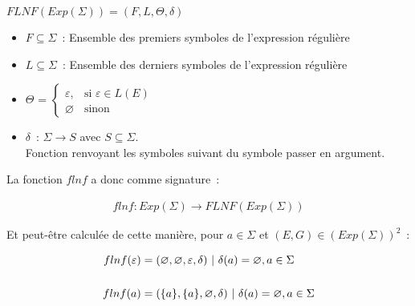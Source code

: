 \vphantom{}

\begin{center}
    \(FLNF(Exp(\Sigma)) = (F, L, \Theta, \delta)\)

    \begin{itemize}
        \item[\textbullet] \(F \subseteq \Sigma\)~: Ensemble des premiers
            symboles de l'expression régulière

            \vphantom{}

        \item[\textbullet] \(L \subseteq \Sigma\)~: Ensemble des derniers
            symboles de l'expression régulière

            \vphantom{}

        \item[\textbullet] \(\Theta\) =
            \(
            \begin{cases}
                \varepsilon, & \text{si } \varepsilon \in L(E) \\
                \varnothing  & \text{sinon}
            \end{cases}
            \)

            \vphantom{}

        \item[\textbullet] \(\delta\)~: \(\Sigma \to S\) avec \(S \subseteq
            \Sigma\). \\
            Fonction renvoyant les symboles suivant du symbole passer en argument.
    \end{itemize}
\end{center}

La fonction \(flnf\) a donc comme signature~:

\begin{align*}
    flnf: Exp(\Sigma) \to FLNF(Exp(\Sigma))
\end{align*}

Et peut-être calculée de cette manière, pour \(a \in \Sigma\) et \((E, G) \in
(Exp(\Sigma))^2\)~:

\begin{align*}
    flnf(\varepsilon) & = (\varnothing, \varnothing, \varepsilon, \delta) ~|~ \delta(a) = \varnothing, a \in \Sigma \\
    \vphantom{} \notag                                                                                              \\
    flnf(a)           & = (\{a\}, \{a\}, \varnothing, \delta) ~|~ \delta(a) = \varnothing, a
    \in \Sigma
\end{align*}

